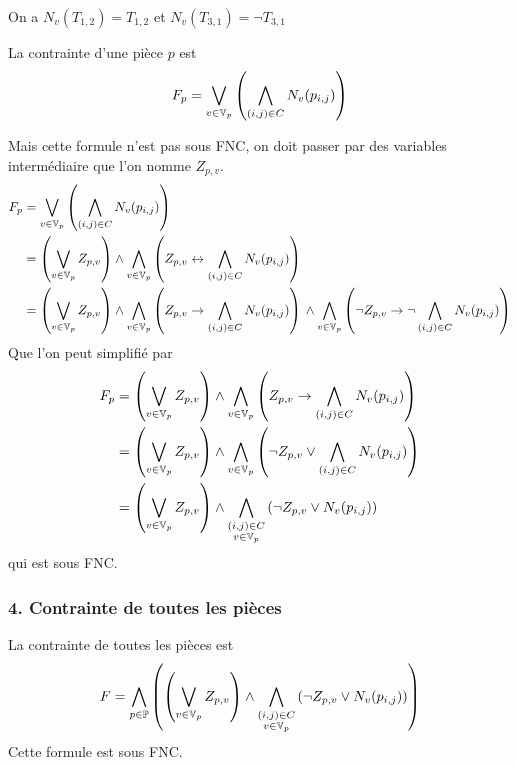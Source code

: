     On a $N_v(T_{1,2}) = T_{1,2}$ et $N_v(T_{3,1}) = \lnot T_{3,1}$
    
    La contrainte d'une pièce $p$ est
    \[F_p = \bigvee_{v\in\mathbb{V}_p} \left( \bigwedge_{(i,j)\in C} N_v(p_{i,j}) \right)\]
    
    Mais cette formule n'est pas sous FNC,
    on doit passer par des variables intermédiaire que l'on nomme $Z_{p,v}$.
    \begin{align*}
        F_p &= \bigvee_{v\in\mathbb{V}_p} \left( \bigwedge_{(i,j)\in C} N_v(p_{i,j}) \right)\\
        &= \left( \bigvee_{v\in\mathbb{V}_p} Z_{p,v} \right)
            \land \bigwedge_{v\in\mathbb{V}_p} \left(Z_{p,v} \leftrightarrow \bigwedge_{(i,j)\in C} N_v(p_{i,j}) \right)\\
        &= \left( \bigvee_{v\in\mathbb{V}_p} Z_{p,v} \right)
            \land \bigwedge_{v\in\mathbb{V}_p} \left(Z_{p,v} \to \bigwedge_{(i,j)\in C} N_v(p_{i,j}) \right){}
            \land \bigwedge_{v\in\mathbb{V}_p} \left(\lnot Z_{p,v} \to \lnot\bigwedge_{(i,j)\in C} N_v(p_{i,j}) \right)\\
    \end{align*}
    Que l'on peut simplifié par
    \begin{align*}
        F_p &= \left( \bigvee_{v\in\mathbb{V}_p} Z_{p,v} \right)
            \land \bigwedge_{v\in\mathbb{V}_p} \left(Z_{p,v} \to \bigwedge_{(i,j)\in C} N_v(p_{i,j}) \right)\\
        &= \left( \bigvee_{v\in\mathbb{V}_p} Z_{p,v} \right)
            \land \bigwedge_{v\in\mathbb{V}_p} \left(\lnot Z_{p,v} \lor \bigwedge_{(i,j)\in C} N_v(p_{i,j}) \right)\\
        &= \left( \bigvee_{v\in\mathbb{V}_p} Z_{p,v} \right)
            \land \bigwedge_{\substack{(i,j)\in C\\v\in\mathbb{V}_p}} \left(\lnot Z_{p,v} \lor N_v(p_{i,j}) \right)\\
    \end{align*}
    qui est sous FNC.
    
    \subsubsection*{4. Contrainte de toutes les pièces}
    La contrainte de toutes les pièces est
    \[F = \bigwedge_{p\in\mathbb{P}} \left(\left( \bigvee_{v\in\mathbb{V}_p} Z_{p,v} \right) \land
        \bigwedge_{\substack{(i,j)\in C\\v\in\mathbb{V}_p}} \left(\lnot Z_{p,v} \lor N_v(p_{i,j}) \right)\right)\]
    Cette formule est sous FNC.
    
